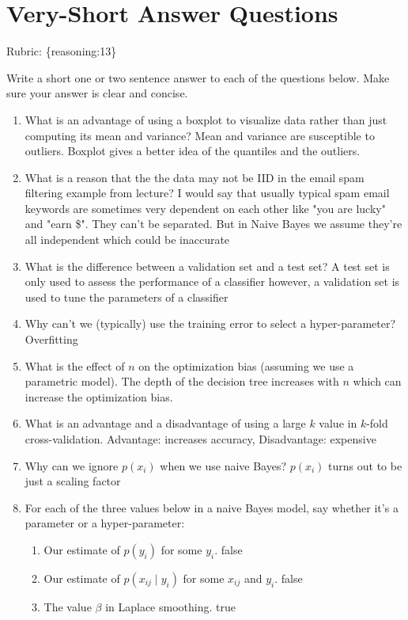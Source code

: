 \documentclass{article}
\def\rubric#1{\gre{Rubric: \{#1\}}}{}
\def\blu#1{{\color{blu}#1}}
\def\gre#1{{\color{gre}#1}}
\def\red#1{{\color{red}#1}}
\def\cond{\; | \;}
\def\enum#1{\begin{enumerate}#1\end{enumerate}}
\begin{document}
\section{Very-Short Answer Questions}
\rubric{reasoning:13}

\blu{Write a short one or two sentence answer to each of the questions below}. Make sure your answer is clear and concise.

\enum{
\item What is an advantage of using a boxplot to visualize data rather than just computing its mean and variance? \red{Mean and variance are susceptible to outliers. Boxplot gives a better idea of the quantiles and the outliers.}
\item What is a reason that the the data may not be IID in the email spam filtering example from lecture? \red{I would say that usually typical 
 spam email keywords are sometimes very dependent on each other like "you are lucky" and "earn \$". They can't be separated. But in Naive Bayes we assume they're all independent which could be inaccurate}
\item What is the difference between a validation set and a test set? \red{A test set is only used to assess the performance of a classifier however, a validation set is used to tune the parameters of a classifier}
\item Why can't we (typically) use the training error to select a hyper-parameter? \red{Overfitting}
\item What is the effect of $n$ on the optimization bias (assuming we use a parametric model). \red{The depth of the decision tree increases with $n$ which can increase the optimization bias.}
\item What is an advantage and a disadvantage of using a large $k$ value in $k$-fold cross-validation. \red{Advantage: increases accuracy, Disadvantage: expensive}
\item Why can we ignore $p(x_i)$ when we use naive Bayes? \red{$p(x_i)$ turns out to be just a scaling factor}
\item For each of the three values below in a naive Bayes model, say whether it's a parameter or a hyper-parameter:
\begin{enumerate}
\item Our estimate of $p(y_i)$ for some $y_i$. \red{false}
\item Our estimate of $p(x_{ij} \cond y_i)$ for some $x_{ij}$ and $y_i$. \red{false}
\item The value $\beta$ in Laplace smoothing. \red{true}

\end{enumerate}}
\end{document}
